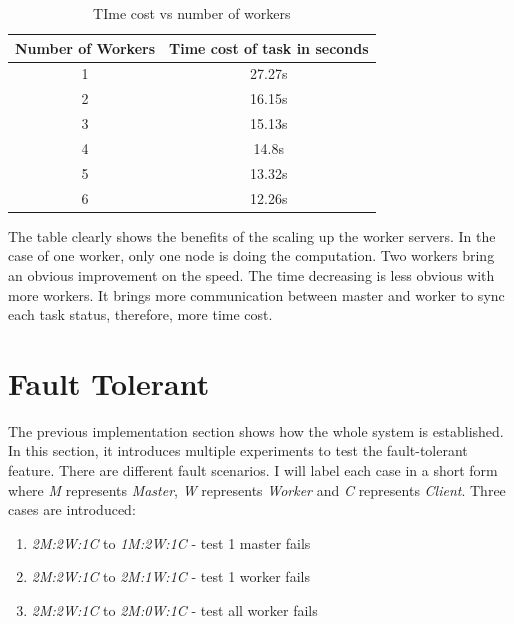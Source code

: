 \documentclass[runningheads,a4paper]{llncs}
\begin{document}
\begin{table}[htp]
\caption{TIme cost vs number of workers}
\begin{center}
\begin{tabular}{|c|c|}
\hline
Number of Workers & Time cost of task in seconds \\ \hline
1                 & 27.27s                       \\ \hline
2                 & 16.15s                       \\ \hline
3                 & 15.13s                       \\ \hline
4                 & 14.8s                        \\ \hline
5                 & 13.32s                       \\ \hline
6                 & 12.26s                       \\ \hline
\end{tabular}
\end{center}
\label{default}
\end{table}%

The table clearly shows the benefits of the scaling up the worker servers. In the case of one worker, only one node is doing the computation. Two workers bring an obvious improvement on the speed. The time decreasing is less obvious with more workers. It brings more communication between master and worker to sync each task status, therefore, more time cost.

\section{Fault Tolerant}

The previous implementation section shows how the whole system is established. In this section, it introduces multiple experiments to test the fault-tolerant feature. There are different fault scenarios. I will label each case in a short form where \emph{M} represents \emph{Master}, \emph{W} represents \emph{Worker} and \emph{C} represents \emph{Client}. Three cases are introduced:

\begin{enumerate}
\item  \emph{2M:2W:1C} to \emph{1M:2W:1C} - test 1 master fails
\item  \emph{2M:2W:1C} to \emph{2M:1W:1C} - test 1 worker fails
\item  \emph{2M:2W:1C} to \emph{2M:0W:1C} - test all worker fails
\end{enumerate}
\end{document}
